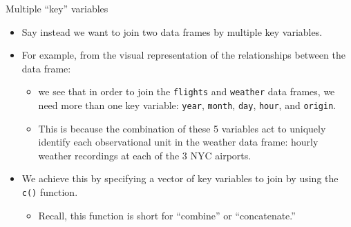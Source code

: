 \documentclass[
  ignorenonframetext,
]{beamer}
\providecommand{\tightlist}{%
  \setlength{\itemsep}{0pt}\setlength{\parskip}{0pt}}
\begin{document}
\begin{frame}[fragile]{Multiple ``key'' variables}
\label{multiple-key-variables}
\begin{itemize}
\item
  Say instead we want to join two data frames by multiple key variables.
\item
  For example, from the visual representation of the relationships
  between the data frame:

  \begin{itemize}
  \tightlist
  \item
    we see that in order to join the \texttt{flights} and
    \texttt{weather} data frames, we need more than one key variable:
    \texttt{year}, \texttt{month}, \texttt{day}, \texttt{hour}, and
    \texttt{origin}.
  \item
    This is because the combination of these 5 variables act to uniquely
    identify each observational unit in the weather data frame: hourly
    weather recordings at each of the 3 NYC airports.
  \end{itemize}
\item
  We achieve this by specifying a vector of key variables to join by
  using the \texttt{c()} function.

  \begin{itemize}
  \tightlist
  \item
    Recall, this function is short for ``combine'' or ``concatenate.''
  \end{itemize}
\end{itemize}
\end{frame}
\end{document}
